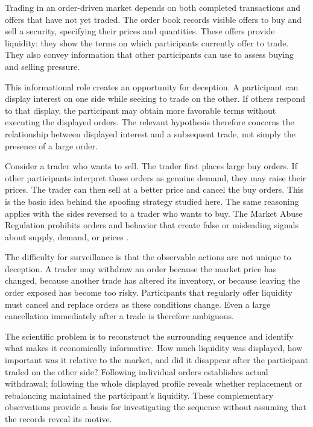 \documentclass[11pt]{article}
\newenvironment{review}{\begingroup\color{blue}}{\endgroup}
\begin{document}
\begin{review}
Trading in an order-driven market depends on both completed transactions and offers that have not yet traded. The order book records visible offers to buy and sell a security, specifying their prices and quantities. These offers provide liquidity: they show the terms on which participants currently offer to trade. They also convey information that other participants can use to assess buying and selling pressure.

This informational role creates an opportunity for deception. A participant can display interest on one side while seeking to trade on the other. If others respond to that display, the participant may obtain more favorable terms without executing the displayed orders. The relevant hypothesis therefore concerns the relationship between displayed interest and a subsequent trade, not simply the presence of a large order.
\end{review}

Consider a trader who wants to sell. The trader first places large buy orders. If other participants interpret those orders as genuine demand, they may raise their prices. The trader can then sell at a better price and cancel the buy orders. This is the basic idea behind the spoofing strategy studied here. The same reasoning applies with the sides reversed to a trader who wants to buy. The Market Abuse Regulation prohibits orders and behavior that create false or misleading signals about supply, demand, or prices \cite{EU5962014}.

\begin{review}
The difficulty for surveillance is that the observable actions are not unique to deception. A trader may withdraw an order because the market price has changed, because another trade has altered its inventory, or because leaving the order exposed has become too risky. Participants that regularly offer liquidity must cancel and replace orders as these conditions change. Even a large cancellation immediately after a trade is therefore ambiguous.

The scientific problem is to reconstruct the surrounding sequence and identify what makes it economically informative. How much liquidity was displayed, how important was it relative to the market, and did it disappear after the participant traded on the other side? Following individual orders establishes actual withdrawal; following the whole displayed profile reveals whether replacement or rebalancing maintained the participant's liquidity. These complementary observations provide a basis for investigating the sequence without assuming that the records reveal its motive.
\end{review}
\end{document}

